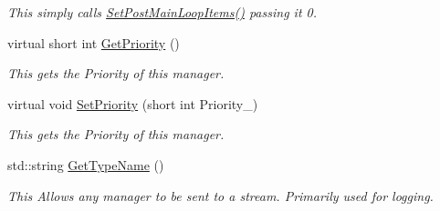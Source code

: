 \begin{DoxyCompactItemize}
\begin{DoxyCompactList}\small\item\em This simply calls \hyperlink{classphys_1_1ManagerBase_a673b3adef73c467f4d90514a5133bf7c}{SetPostMainLoopItems()} passing it 0. \item\end{DoxyCompactList}\item 
virtual short int \hyperlink{classphys_1_1ManagerBase_af1798db3b808a658bdf14d8914d9b91d}{GetPriority} ()
\begin{DoxyCompactList}\small\item\em This gets the Priority of this manager. \item\end{DoxyCompactList}\item 
virtual void \hyperlink{classphys_1_1ManagerBase_a6e30dc5f2a9c64f95efb2ef4428b0f98}{SetPriority} (short int Priority\_\-)
\begin{DoxyCompactList}\small\item\em This gets the Priority of this manager. \item\end{DoxyCompactList}\item 
std::string \hyperlink{classphys_1_1ManagerBase_a5b4c1105696b868b7858c59541af4756}{GetTypeName} ()
\begin{DoxyCompactList}\small\item\em This Allows any manager to be sent to a stream. Primarily used for logging. \item\end{DoxyCompactList}\end{DoxyCompactItemize}
